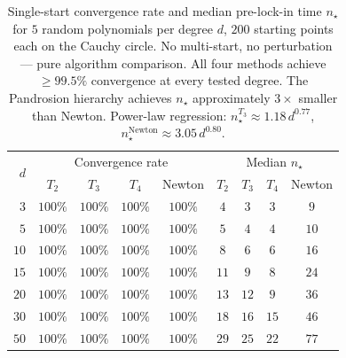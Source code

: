 \documentclass[11pt,a4paper]{article}
\theoremstyle{definition}
\begin{document}
\begin{table}[H]
\centering
\renewcommand{\arraystretch}{1.2}
\begin{tabular}{r|cccc|cccc}
\toprule
\multirow{2}{*}{$d$} & \multicolumn{4}{c|}{Convergence rate} & \multicolumn{4}{c}{Median $n_\star$} \\
& $T_2$ & $T_3$ & $T_4$ & Newton & $T_2$ & $T_3$ & $T_4$ & Newton \\
\midrule
$3$ & $100\%$ & $100\%$ & $100\%$ & $100\%$ & $4$ & $3$ & $3$ & $9$ \\
$5$ & $100\%$ & $100\%$ & $100\%$ & $100\%$ & $5$ & $4$ & $4$ & $10$ \\
$10$ & $100\%$ & $100\%$ & $100\%$ & $100\%$ & $8$ & $6$ & $6$ & $16$ \\
$15$ & $100\%$ & $100\%$ & $100\%$ & $100\%$ & $11$ & $9$ & $8$ & $24$ \\
$20$ & $100\%$ & $100\%$ & $100\%$ & $100\%$ & $13$ & $12$ & $9$ & $36$ \\
$30$ & $100\%$ & $100\%$ & $100\%$ & $100\%$ & $18$ & $16$ & $15$ & $46$ \\
$50$ & $100\%$ & $100\%$ & $100\%$ & $100\%$ & $29$ & $25$ & $22$ & $77$ \\
\bottomrule
\end{tabular}
\caption{Single-start convergence rate and median pre-lock-in time $n_\star$ for $5$ random polynomials per degree $d$, $200$ starting points each on the Cauchy circle.  No multi-start, no perturbation --- pure algorithm comparison.  All four methods achieve $\geq 99.5\%$ convergence at every tested degree.  The Pandrosion hierarchy achieves $n_\star$ approximately $3\times$ smaller than Newton.  Power-law regression: $n_\star^{T_3} \approx 1.18\, d^{0.77}$, $n_\star^{\mathrm{Newton}} \approx 3.05\, d^{0.80}$.}
\label{tab:scaling_higher_order}
\end{table}
\end{document}
